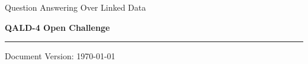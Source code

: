 \documentclass[a4paper]{article}
\begin{document}
\thispagestyle{empty}

%

\begin{center}

{\sc\large Question Answering Over Linked Data} 

\vspace{.3cm}

{\huge\bf QALD-4 Open Challenge}
\end{center}

\hrule

\vspace{.4cm}

{\sc Document Version:} \today

\vspace{.4cm}
\end{document}
